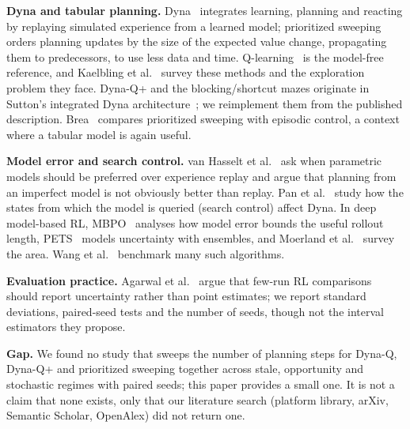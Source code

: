 \textbf{Dyna and tabular planning.} Dyna~\cite{sutton1991dyna} integrates learning, planning and reacting by replaying simulated experience from a learned model; prioritized sweeping~\cite{moore1993prioritized} orders planning updates by the size of the expected value change, propagating them to predecessors, to use less data and time. Q-learning~\cite{watkins1992q} is the model-free reference, and Kaelbling et al.~\cite{kaelbling1996reinforcement} survey these methods and the exploration problem they face. Dyna-Q+ and the blocking/shortcut mazes originate in Sutton's integrated Dyna architecture~\cite{sutton1990integrated}; we reimplement them from the published description. Brea~\cite{brea2017is} compares prioritized sweeping with episodic control, a context where a tabular model is again useful.

\textbf{Model error and search control.} van Hasselt et al.~\cite{hasselt2019when} ask when parametric models should be preferred over experience replay and argue that planning from an imperfect model is not obviously better than replay. Pan et al.~\cite{pan2019hill} study how the states from which the model is queried (search control) affect Dyna. In deep model-based RL, MBPO~\cite{janner2019when} analyses how model error bounds the useful rollout length, PETS~\cite{chua2018deep} models uncertainty with ensembles, and Moerland et al.~\cite{moerland2020model} survey the area. Wang et al.~\cite{wang2019benchmarking} benchmark many such algorithms.

\textbf{Evaluation practice.} Agarwal et al.~\cite{agarwal2021deep} argue that few-run RL comparisons should report uncertainty rather than point estimates; we report standard deviations, paired-seed tests and the number of seeds, though not the interval estimators they propose.

\textbf{Gap.} We found no study that sweeps the number of planning steps for Dyna-Q, Dyna-Q+ and prioritized sweeping together across stale, opportunity and stochastic regimes with paired seeds; this paper provides a small one. It is not a claim that none exists, only that our literature search (platform library, arXiv, Semantic Scholar, OpenAlex) did not return one.
